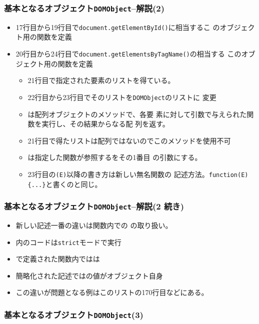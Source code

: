  \begin{frame}[containsverbatim]
  \frametitle{基本となるオブジェクト\texttt{DOMObject}--解説(2)}
\begin{itemize}
 \item 17行目から19行目で\texttt{document.getElementById()}に相当するこ
       のオブジェクト用の関数を定義
 \item 20行目から24行目で\texttt{document.getElementsByTagName()}の相当する
       このオブジェクト用の関数を定義
       \begin{itemize}
        \item 21行目で指定された要素のリストを得ている。
        \item 22行目から23行目でそのリストを\texttt{DOMObject}のリストに
              変更
        \item {}は配列オブジェクトのメソッドで、各要
              素に対して引数で与えられた関数を実行し、その結果からなる配
              列を返す。
        \item 21行目で得たリストは配列ではないのでこのメソッドを使用不可
        \item {}は指定した関数が参照するをその1番目
              の引数にする。
        \item 23行目の\texttt{(E)}以降の書き方は新しい無名関数の
              記述方法。\Verb+function(E){...}+と書くのと同じ。
       \end{itemize}
\end{itemize}
 \end{frame}
 \begin{frame}[containsverbatim]
  \frametitle{基本となるオブジェクト\texttt{DOMObject}--解説(2 続き)}
\begin{itemize}
        \item 新しい記述一番の違いは関数内での
              の取り扱い。
        \item {}内のコードは\texttt{strict}モードで実行
        \item {}で定義された関数内ではは
        \item 簡略化された記述ではの値がオブジェクト自身
        \item この違いが問題となる例はこのリストの170行目などにある。
\end{itemize}
 \end{frame}
 \begin{frame}[containsverbatim]
  \frametitle{基本となるオブジェクト\texttt{DOMObject}(3)}
 \end{frame}
